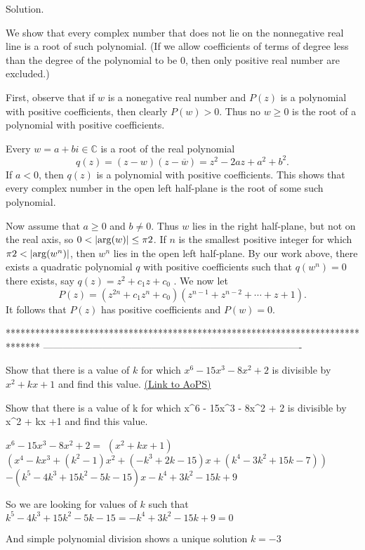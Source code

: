 \begin{solution}
	\begin{bolded}Solution.\end{bolded}

We show that every complex number that does not lie on the nonnegative real line is a root of such polynomial. (If we allow coefficients of terms of degree less than the degree of the polynomial to be $ 0$, then only positive real number are excluded.)

First, observe that if $ w$ is a nonegative real number and $ P(z)$ is a polynomial with positive coefficients, then clearly $ P(w)>0$. Thus no $ w\geq0$ is the root of a polynomial with positive coefficients.

Every $ w=a+bi \in \mathbb{C}$ is a root of the real polynomial \[ q(z)=(z-w)(z-\overline{w})=z^2-2az+a^2+b^2.\] If $ a<0$, then $ q(z)$ is a polynomial with positive coefficients. This shows that every complex number in the open left half-plane is the root of some such polynomial.

Now assume that $ a\geq0$ and $ b\neq0$. Thus $ w$ lies in the right half-plane, but not on the real axis, so $ 0<\left | \arg(w) \right |\leq \pi\/2$. If $ n$ is the smallest positive integer for which $ \pi\/2<\left | \arg(w^n) \right |$, then $ w^n$ lies in the open left half-plane. By our work above, there exists a quadratic polynomial $ q$ with positive coefficients such that $ q(w^n)=0$there exists, say $ q(z)=z^2+c_1z+c_0$ . We now let \[ P(z)=(z^{2n}+c_1z^n+c_0)(z^{n-1}+z^{n-2}+\cdots+z+1).\] It follows that $ P(z)$ has positive coefficients and $ P(w)=0$.
\end{solution}
*******************************************************************************
-------------------------------------------------------------------------------

\begin{problem}
	Show that there is a value of $k$ for which $x^6 - 15x^3 - 8x^2 + 2$ is divisible by $x^2 + kx +1$ and find this value.
	\flushright \href{https://artofproblemsolving.com/community/c6h332750}{(Link to AoPS)}
\end{problem}



\begin{solution}
	\begin{tcolorbox}Show that there is a value of k for which x^6 - 15x^3 - 8x^2 + 2 is divisible by x^2 + kx +1 and find this value.\end{tcolorbox}

$ x^6 - 15x^3 - 8x^2 + 2=$ $ (x^2+kx+1)$ $ (x^4-kx^3+(k^2-1)x^2+(-k^3+2k-15)x+(k^4-3k^2+15k-7))$ $ -(k^5-4k^3+15k^2-5k-15)x-k^4+3k^2-15k+9$

So we are looking for values of $ k$ such that $ k^5-4k^3+15k^2-5k-15=-k^4+3k^2-15k+9=0$

And simple polynomial division shows a unique solution $ k=-3$
\end{solution}



